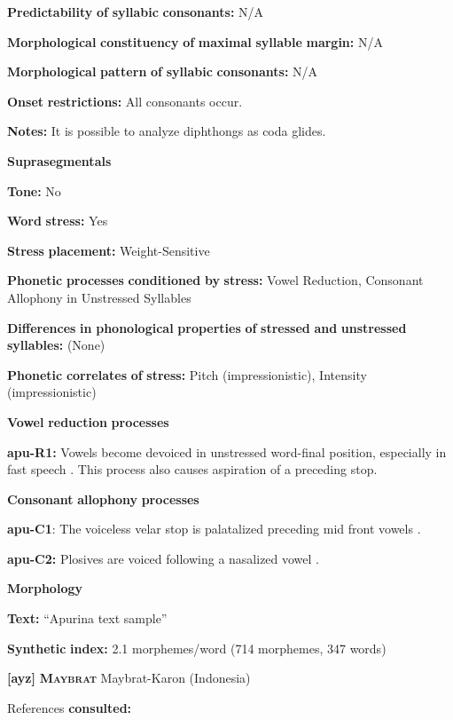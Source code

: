 \begin{styleBody}
\textbf{Predictability} \textbf{of} \textbf{syllabic} \textbf{consonants:} N/A

\textbf{Morphological} \textbf{constituency} \textbf{of} \textbf{maximal} \textbf{syllable} \textbf{margin:} N/A

\textbf{Morphological} \textbf{pattern} \textbf{of} \textbf{syllabic} \textbf{consonants:} N/A

\textbf{Onset} \textbf{restrictions:} All consonants occur.

\textbf{Notes:} It is possible to analyze diphthongs as coda glides.

\textbf{Suprasegmentals}

\textbf{Tone:} No

\textbf{Word} \textbf{stress:} Yes

\textbf{Stress} \textbf{placement:} Weight-Sensitive

\textbf{Phonetic} \textbf{processes} \textbf{conditioned} \textbf{by} \textbf{stress:} Vowel Reduction, Consonant Allophony in Unstressed Syllables

\textbf{Differences} \textbf{in} \textbf{phonological} \textbf{properties} \textbf{of} \textbf{stressed} \textbf{and} \textbf{unstressed} \textbf{syllables:} (None)

\textbf{Phonetic} \textbf{correlates} \textbf{of} \textbf{stress:} Pitch (impressionistic), Intensity (impressionistic)

\textbf{Vowel} \textbf{reduction} \textbf{processes}

\textbf{apu-R1:} Vowels become devoiced in unstressed word-final position, especially in fast speech \citep[60-1]{Facundes2000}. This process also causes aspiration of a preceding stop.

\textbf{Consonant} \textbf{allophony} \textbf{processes}

\textbf{apu-C1}: The voiceless velar stop is palatalized preceding mid front vowels \citep[76]{Facundes2000}.

\textbf{apu-C2:} Plosives are voiced following a nasalized vowel \citep[73]{Facundes2000}.

\textbf{Morphology}

\textbf{Text:} “Apurina text sample” \citep[625-642]{Facundes2000}

\textbf{Synthetic} \textbf{index:} 2.1 morphemes/word (714 morphemes, 347 words)

\textbf{[ayz]}   \textbf{\textsc{Maybrat}}  Maybrat-Karon (Indonesia)

References \textbf{consulted:} \citet{Dol2007}


\end{styleBody}
